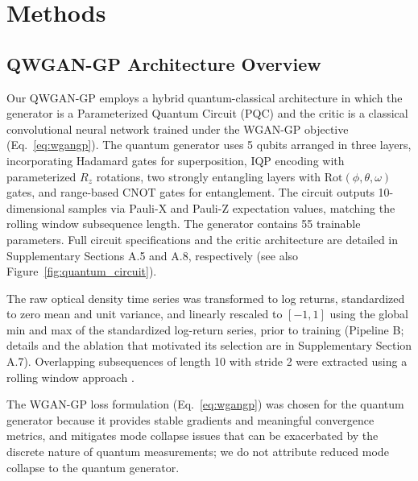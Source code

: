 \documentclass[12pt,twocolumn]{article}
\begin{document}
\section{Methods}

\subsection{QWGAN-GP Architecture Overview}

Our QWGAN-GP employs a hybrid quantum-classical architecture in which the generator
is a Parameterized Quantum Circuit (PQC) and the critic is a classical convolutional
neural network trained under the WGAN-GP objective (Eq.~\ref{eq:wgangp}). The quantum
generator uses 5 qubits arranged in three layers, incorporating Hadamard gates for
superposition, IQP encoding with parameterized $R_z$ rotations, two strongly entangling
layers with $\text{Rot}(\phi, \theta, \omega)$ gates, and range-based CNOT gates for
entanglement. The circuit outputs 10-dimensional samples via Pauli-X and Pauli-Z
expectation values, matching the rolling window subsequence length. The generator
contains 55 trainable parameters. Full circuit specifications and the critic architecture
are detailed in Supplementary Sections A.5 and A.8, respectively (see also Figure~\ref{fig:quantum_circuit}).

The raw optical density time series was transformed to log returns, standardized to zero
mean and unit variance, and linearly rescaled to $[-1, 1]$ using the global min and
max of the standardized log-return series, prior to training (Pipeline B; details and
the ablation that motivated its selection are in Supplementary Section A.7).
Overlapping subsequences of length 10 with stride 2 were extracted using a rolling
window approach \cite{bergmeir2012rolling}.

The WGAN-GP loss formulation (Eq.~\ref{eq:wgangp}) was chosen for the quantum generator because it provides stable gradients and meaningful convergence metrics, and mitigates mode collapse issues that can be exacerbated by the discrete nature of quantum measurements; we do not attribute reduced mode collapse to the quantum generator.
\end{document}
